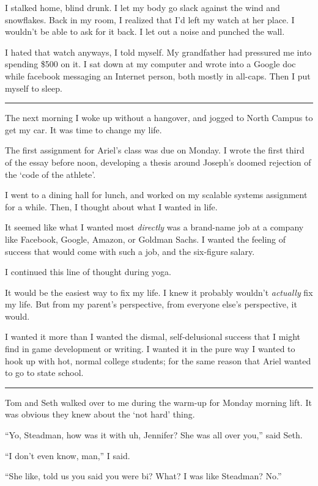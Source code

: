 I stalked home, blind drunk.  I let my body go slack against the wind and
snowflakes.  Back in my room, I realized that I'd left my watch at her place.  I
wouldn't be able to ask for it back.  I let out a noise and punched the wall.

I hated that watch anyways, I told myself.  My grandfather had pressured me into
spending \$500 on it.   I sat down at my computer and wrote into a Google doc
while facebook messaging an Internet person, both mostly in all-caps.  Then I
put myself to sleep.

\plainfancybreak{12pt}{2}{}

The next morning I woke up without a hangover, and jogged to North Campus to get
my car.  It was time to change my life.

The first assignment for Ariel's class was due on Monday.  I wrote the first
third of the essay before noon, developing a thesis around Joseph's doomed
rejection of the `code of the athlete'.

I went to a dining hall for lunch, and worked on my scalable systems assignment
for a while.  Then, I thought about what I wanted in life.

It seemed like what I wanted most \textit{directly} was a brand-name job at a
company like Facebook, Google, Amazon, or Goldman Sachs.  I wanted the feeling
of success that would come with such a job, and the six-figure salary.

I continued this line of thought during yoga.

It would be the easiest way to fix my life.  I knew it probably wouldn't
\textit{actually} fix my life.  But from my parent's perspective, from everyone
else's perspective, it would.

I wanted it more than I wanted the dismal, self-delusional success that I might
find in game development or writing.  I wanted it in the pure way I wanted to
hook up with hot, normal college students; for the same reason that Ariel
wanted to go to state school.

\plainfancybreak{12pt}{2}{}

Tom and Seth walked over to me during the warm-up for Monday morning lift.  It
was obvious they knew about the `not hard' thing.

``Yo, Steadman, how was it with uh, Jennifer?  She was all over you,'' said
Seth.

``I don't even know, man,'' I said.

``She like, told us you said you were bi?  What?  I was like Steadman?
No.''

